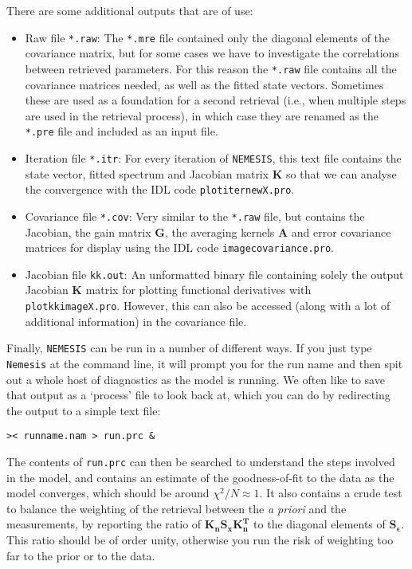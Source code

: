\documentclass[final,5p,times,twocolumn,authoryear]{elsarticle}
\begin{document}
There are some additional outputs that are of use:
\begin{itemize}
\item Raw file \verb#*.raw#:  The \verb#*.mre# file contained only the diagonal elements of the covariance matrix, but for some cases we have to investigate the correlations between retrieved parameters.  For this reason the \verb#*.raw# file contains all the covariance matrices needed, as well as the fitted state vectors.  Sometimes these are used as a foundation for a second retrieval (i.e., when multiple steps are used in the retrieval process), in which case they are renamed as the \verb#*.pre# file and included as an input file.
\item Iteration file \verb#*.itr#:  For every iteration of \verb#NEMESIS#, this text file contains the state vector, fitted spectrum and Jacobian matrix $\mathbf{K}$ so that we can analyse the convergence with the IDL code \verb#plotiternewX.pro#.
\item Covariance file \verb#*.cov#:  Very similar to the \verb#*.raw# file, but contains the Jacobian, the gain matrix $\mathbf{G}$, the averaging kernels $\mathbf{A}$ and error covariance matrices for display using the IDL code \verb#imagecovariance.pro#.
\item Jacobian file \verb#kk.out#:  An unformatted binary file containing solely the output Jacobian $\mathbf{K}$ matrix for plotting functional derivatives with \verb#plotkkimageX.pro#.  However, this can also be accessed (along with a lot of additional information) in the covariance file.
\end{itemize}

Finally, \verb#NEMESIS# can be run in a number of different ways.  If you just type \verb#Nemesis# at the command line, it will prompt you for the run name and then spit out a whole host of diagnostics as the model is running.  We often like to save that output as a `process' file to look back at, which you can do by redirecting the output to a simple text file:

\verb#>< runname.nam > run.prc &#

The contents of \verb#run.prc# can then be searched to understand the steps involved in the model, and contains an estimate of the goodness-of-fit to the data as the model converges, which should be around $\chi^2/N\approx1$.  It also contains a crude test to balance the weighting of the retrieval between the \textit{a priori} and the measurements, by reporting the ratio of $\mathbf{K_nS_xK_n^T}$ to the diagonal elements of $\mathbf{S_\epsilon}$.  This ratio should be of order unity, otherwise you run the risk of weighting too far to the prior or to the data.
\end{document}
